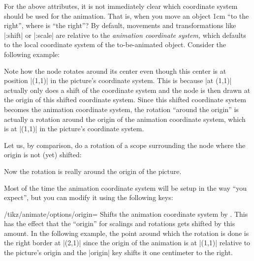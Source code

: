 For the above attributes, it is not immediately clear which coordinate system
should be used for the animation. That is, when you move an object 1cm ``to the
right'', where is ``the right''? By default, movements and transformations like
|:shift| or |:scale| are relative to the \emph{animation coordinate system,}
which defaults to the local coordinate system of the to-be-animated object.
Consider the following example:
%
\begin{codeexample}[imagesource={standalone/pgfmanual-en-tikz-animations-animation-43.svg}]
\end{codeexample}
%
Note how the node rotates around its center even though this center is at
position |(1,1)| in the picture's coordinate system. This is because |at (1,1)|
actually only does a shift of the coordinate system and the node is then drawn
at the origin of this shifted coordinate system. Since this shifted coordinate
system becomes the animation coordinate system, the rotation ``around the
origin'' is actually a rotation around the origin of the animation coordinate
system, which is at |(1,1)| in the picture's coordinate system.

Let us, by comparison, do a rotation of a scope surrounding the node where the
origin is not (yet) shifted:
%
\begin{codeexample}[imagesource={standalone/pgfmanual-en-tikz-animations-animation-44.svg}]
\end{codeexample}
%
Now the rotation is really around the origin of the picture.

Most of the time the animation coordinate system will be setup in the way ``you
expect'', but you can modify it using the following keys:

\begin{key}{/tikz/animate/options/origin=}
    Shifts the animation coordinate system by . This has the
    effect that the ``origin'' for scalings and rotations gets shifted by this
    amount. In the following example, the point around which the rotation is
    done is the right border at |(2,1)| since the origin of the animation is at
    |(1,1)| relative to the picture's origin and the |origin| key shifts it one
    centimeter to the right.
\begin{codeexample}[imagesource={standalone/pgfmanual-en-tikz-animations-animation-45.svg}]
\end{codeexample}
\end{key}

